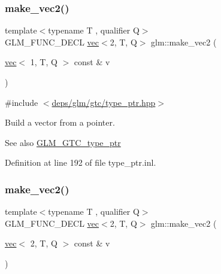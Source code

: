\subsubsection{\texorpdfstring{make\+\_\+vec2()}{make\_vec2()}\hspace{0.1cm}{\footnotesize\ttfamily [1/5]}}
{\footnotesize\ttfamily template$<$typename T , qualifier Q$>$ \\
G\+L\+M\+\_\+\+F\+U\+N\+C\+\_\+\+D\+E\+CL \hyperlink{structglm_1_1vec}{vec}$<$2, T, Q$>$ glm\+::make\+\_\+vec2 (\begin{DoxyParamCaption}\item[{\hyperlink{structglm_1_1vec}{vec}$<$ 1, T, Q $>$ const \&}]{v }\end{DoxyParamCaption})\hspace{0.3cm}{\ttfamily [inline]}}



{\ttfamily \#include $<$\hyperlink{type__ptr_8hpp}{deps/glm/gtc/type\+\_\+ptr.\+hpp}$>$}

Build a vector from a pointer. \begin{DoxySeeAlso}{See also}
\hyperlink{group__gtc__type__ptr}{G\+L\+M\+\_\+\+G\+T\+C\+\_\+type\+\_\+ptr} 
\end{DoxySeeAlso}


Definition at line 192 of file type\+\_\+ptr.\+inl.

\mbox{\label{group__gtc__type__ptr_gae54bd325a08ad26edf63929201adebc7}} 
\subsubsection{\texorpdfstring{make\+\_\+vec2()}{make\_vec2()}\hspace{0.1cm}{\footnotesize\ttfamily [2/5]}}
{\footnotesize\ttfamily template$<$typename T , qualifier Q$>$ \\
G\+L\+M\+\_\+\+F\+U\+N\+C\+\_\+\+D\+E\+CL \hyperlink{structglm_1_1vec}{vec}$<$2, T, Q$>$ glm\+::make\+\_\+vec2 (\begin{DoxyParamCaption}\item[{\hyperlink{structglm_1_1vec}{vec}$<$ 2, T, Q $>$ const \&}]{v }\end{DoxyParamCaption})\hspace{0.3cm}{\ttfamily [inline]}}




